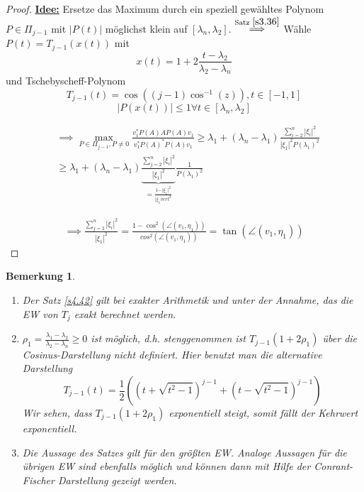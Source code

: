 \documentclass{book}
\newtheorem{remark}[algorithm]{Bemerkung}
\begin{document}
\begin{proof}
                \underline{\textbf{Idee:}} Ersetze das Maximum durch ein speziell gewähltes Polynom $P\in\Pi_{j-1}$ mit $\left\vert P(t) \right\vert$ 
                möglichst klein auf $[\lambda_n,\lambda_2]$.
                $\stackrel{\text{Satz }\ref{s3.36}}{\implies}$ Wähle $P(t)=T_{j-1}(x(t))$ mit 
                \[x(t)=1+2\frac{t-\lambda_2}{\lambda_2-\lambda_n}\]
                und Tschebyscheff-Polynom 
                \[T_{j-1}(t)=\cos((j-1)\cos^{-1}(z)),t\in[-1,1]\]
                \begin{equation*}
                    \left\vert P(x(t)) \right\vert\leq 1 \forall t\in[\lambda_n,\lambda_2]
                \end{equation*}

                \begin{align*}
                    &\implies \max_{P\in \Pi_{j-1},P\neq 0}\frac{v_1^* P(A)AP(A)v_1}{v_1^*P(A)^*P(A)v_1}\geq \lambda_1+(\lambda_n-\lambda_1)\frac{\sum_{i=2}^n\left\vert \xi_i \right\vert^2}{\left\vert \xi_1 \right\vert^2P(\lambda_1)^2}\\
                    &\geq \lambda_1+(\lambda_n-\lambda_1)\underbrace{\frac{\sum_{j=2}^n \left\vert \xi_i \right\vert^2}{\left\vert \xi_1 \right\vert^2}}_{=\frac{1-\vert\xi_1\vert^2}{\vert\xi_1vert^2}}\frac{1}{P(\lambda_1)^2}
                \end{align*}

                \begin{align*}
                        \implies \frac{\sum_{j=2}^n \left\vert \xi_i \right\vert^2}{\left\vert \xi_1 \right\vert^2}=\frac{1-\cos^2(\angle(v_1,\eta_1))}{cos^2(\angle(v_1,\eta_1))}=\tan(\angle(v_1,\eta_1))
                \end{align*}

            \end{proof}

            \begin{remark}\label{b4.43}
                \begin{enumerate}
                    \item Der Satz \ref{s4.42} gilt bei exakter Arithmetik und unter der Annahme, das die EW von $T_j$ exakt berechnet werden.
                    \item $\rho_1=\frac{\lambda_1-\lambda_2}{\lambda_2-\lambda_n}\geq 0$ ist möglich, d.h. stenggenommen ist $T_{j-1}(1+2\rho_1)$ über die Cosinus-Darstellung nicht definiert.
                        Hier benutzt man die alternative Darstellung \[T_{j-1}(t)=\frac{1}{2}\left(\left(t+\sqrt{t^2-1}\right)^{j-1}+\left(t-\sqrt{t^2-1}\right)^{j-1}\right)\]
                        Wir sehen, dass $T_{j-1}(1+2\rho_1)$ exponentiell steigt, somit fällt der Kehrwert exponentiell.
                    \item Die Aussage des Satzes gilt für den größten EW. Analoge Aussagen für die übrigen EW sind ebenfalls möglich und können dann mit Hilfe der Conrant-Fischer Darstellung gezeigt werden.
                \end{enumerate}
            \end{remark}
\end{document}
